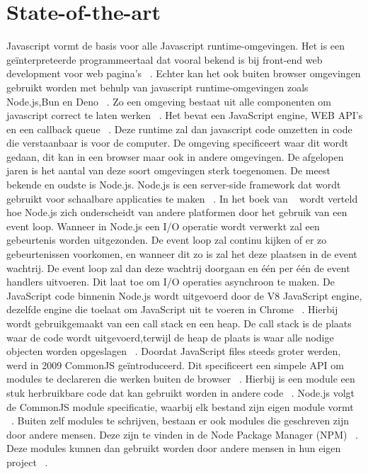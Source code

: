 \section{State-of-the-art}%
\label{sec:state-of-the-art}
Javascript vormt de basis voor alle Javascript runtime-omgevingen. 
Het is een geïnterpreteerde programmeertaal dat vooral bekend is bij front-end web development voor web pagina's ~\autocite{Mozilla2023}.
Echter kan het ook buiten browser omgevingen gebruikt worden met behulp van javascript runtime-omgevingen zoals Node.js,Bun en Deno ~\autocite{Mozilla2023}.
Zo een omgeving bestaat uit alle componenten om javascript correct te laten werken ~\autocite{Christopher}. 
Het bevat een JavaScript engine, WEB API's en een callback queue ~\autocite{Christopher}. 
Deze runtime zal dan javascript code omzetten in code die verstaanbaar is voor de computer.
De omgeving specificeert waar dit wordt gedaan, dit kan in een browser maar ook in andere omgevingen.
De afgelopen jaren is het aantal van deze soort omgevingen sterk toegenomen. 
De meest bekende en oudste is Node.js. 
Node.js is een server-side framework dat wordt gebruikt voor schaalbare applicaties te maken ~\autocite{Gackenheimer2013}.
In het boek van ~\textcite{Ali2013} wordt verteld hoe Node.js zich onderscheidt van andere platformen door het gebruik van een event loop. 
Wanneer in Node.js een I/O operatie wordt verwerkt zal een gebeurtenis worden uitgezonden. 
De event loop zal continu kijken of er zo gebeurtenissen voorkomen, 
en wanneer dit zo is zal het deze plaatsen in de event wachtrij. 
De event loop zal dan deze wachtrij doorgaan en één per één de event handlers uitvoeren. 
Dit laat toe om I/O operaties asynchroon te maken.
De JavaScript code binnenin Node.js wordt uitgevoerd door de V8 JavaScript engine, 
dezelfde engine die toelaat om JavaScript uit te voeren in Chrome ~\autocite{Syed2014}.
Hierbij wordt gebruikgemaakt van een call stack en een heap. 
De call stack is de plaats waar de code wordt uitgevoerd,terwijl de heap de plaats is waar alle nodige objecten worden opgeslagen ~\autocite{Christopher}.
Doordat JavaScript files steeds groter werden, werd in 2009 CommonJS geïntroduceerd. 
Dit specificeert een simpele API om modules te declareren die werken buiten de browser ~\autocite{Osmani2012}.
Hierbij is een module een stuk herbruikbare code dat kan gebruikt worden in  andere code ~\autocite{Osmani2012}.
Node.js volgt de CommonJS module specificatie, waarbij elk bestand zijn eigen module vormt ~\autocite{Syed2014}.
Buiten zelf modules te schrijven, bestaan er ook modules die geschreven zijn door andere mensen. 
Deze zijn te vinden in de Node Package Manager (NPM) ~\autocite{Wittern2016}. 
Deze modules kunnen dan gebruikt worden door andere mensen in hun eigen project ~\autocite{Ali2013}.

